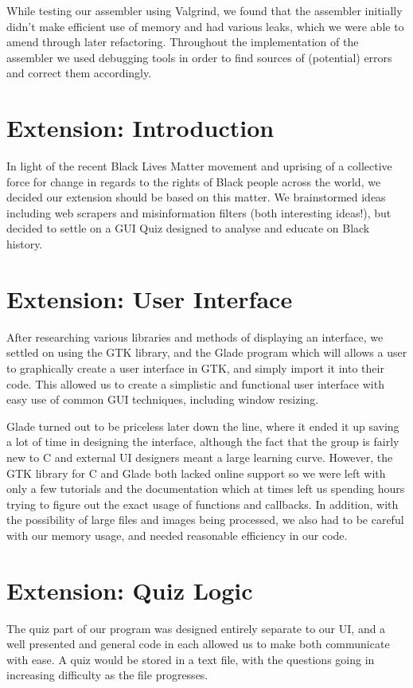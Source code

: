 \documentclass{article}
\begin{document}
While testing our assembler using Valgrind, we found that the assembler initially didn't make efficient use of memory and had various leaks, which we were able to amend through later refactoring. Throughout the implementation of the assembler we used debugging tools in order to find sources of (potential) errors and correct them accordingly. 

\section{Extension: Introduction}
In light of the recent Black Lives Matter movement and uprising of a collective force for change in regards to the rights of Black people across the world, we decided our extension should be based on this matter. We brainstormed ideas including web scrapers and misinformation filters (both interesting ideas!), but decided to settle on a GUI Quiz designed to analyse and educate on Black history.

\section{Extension: User Interface}
After researching various libraries and methods of displaying an interface, we settled on using the GTK library, and the Glade program which will allows a user to graphically create a user interface in GTK, and simply import it into their code. This allowed us to create a simplistic and functional user interface with easy use of common GUI techniques, including window resizing. 

Glade turned out to be priceless later down the line, where it ended it up saving a lot of time in designing the interface, although the fact that the group is fairly new to C and external UI designers meant a large learning curve. However, the GTK library for C and Glade both lacked online support so we were left with only a few tutorials and the documentation which at times left us spending hours trying to figure out the exact usage of functions and callbacks. In addition, with the possibility of large files and images being processed, we also had to be careful with our memory usage, and needed reasonable efficiency in our code.  

\section{Extension: Quiz Logic}
The quiz part of our program was designed entirely separate to our UI, and a well presented and general code in each allowed us to make both communicate with ease. A quiz would be stored in a text file, with the questions going in increasing difficulty as the file progresses. 
\end{document}
